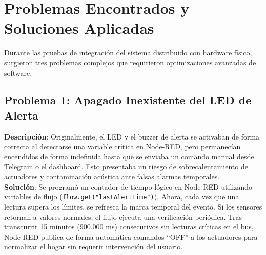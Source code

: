 \documentclass[12pt,letterpaper]{article}
\begin{document}
\section{Problemas Encontrados y Soluciones Aplicadas}
Durante las pruebas de integración del sistema distribuido con hardware físico, surgieron tres problemas complejos que requirieron optimizaciones avanzadas de software.

\subsection{Problema 1: Apagado Inexistente del LED de Alerta}
\textbf{Descripción}: Originalmente, el LED y el buzzer de alerta se activaban de forma correcta al detectarse una variable crítica en Node-RED, pero permanecían encendidos de forma indefinida hasta que se enviaba un comando manual desde Telegram o el dashboard. Esto presentaba un riesgo de sobrecalentamiento de actuadores y contaminación acústica ante falsas alarmas temporales. \\
\textbf{Solución}: Se programó un contador de tiempo lógico en Node-RED utilizando variables de flujo (\texttt{flow.get("lastAlertTime")}). Ahora, cada vez que una lectura supera los límites, se refresca la marca temporal del evento. Si los sensores retornan a valores normales, el flujo ejecuta una verificación periódica. Tras transcurrir 15 minutos ($900.000$ ms) consecutivos sin lecturas críticas en el bus, Node-RED publica de forma automática comandos ``OFF'' a los actuadores para normalizar el hogar sin requerir intervención del usuario.
\end{document}
